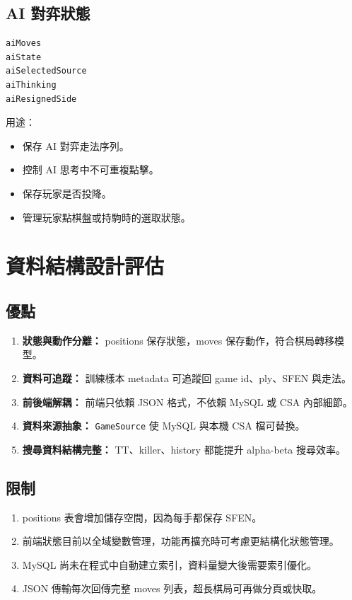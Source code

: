 \documentclass[12pt,a4paper,fontset=none]{ctexart}
\begin{document}
\subsection{AI 對弈狀態}

\begin{lstlisting}[style=cmd]
aiMoves
aiState
aiSelectedSource
aiThinking
aiResignedSide
\end{lstlisting}

用途：

\begin{itemize}
  \item 保存 AI 對弈走法序列。
  \item 控制 AI 思考中不可重複點擊。
  \item 保存玩家是否投降。
  \item 管理玩家點棋盤或持駒時的選取狀態。
\end{itemize}

\section{資料結構設計評估}

\subsection{優點}

\begin{enumerate}
  \item \textbf{狀態與動作分離：} positions 保存狀態，moves 保存動作，符合棋局轉移模型。
  \item \textbf{資料可追蹤：} 訓練樣本 metadata 可追蹤回 game id、ply、SFEN 與走法。
  \item \textbf{前後端解耦：} 前端只依賴 JSON 格式，不依賴 MySQL 或 CSA 內部細節。
  \item \textbf{資料來源抽象：} \texttt{GameSource} 使 MySQL 與本機 CSA 檔可替換。
  \item \textbf{搜尋資料結構完整：} TT、killer、history 都能提升 alpha-beta 搜尋效率。
\end{enumerate}

\subsection{限制}

\begin{enumerate}
  \item positions 表會增加儲存空間，因為每手都保存 SFEN。
  \item 前端狀態目前以全域變數管理，功能再擴充時可考慮更結構化狀態管理。
  \item MySQL 尚未在程式中自動建立索引，資料量變大後需要索引優化。
  \item JSON 傳輸每次回傳完整 moves 列表，超長棋局可再做分頁或快取。
\end{enumerate}
\end{document}
